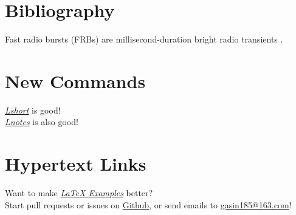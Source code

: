 \documentclass[a4paper,10pt]{article}
\begin{document}
    \section{Bibliography}
    Fast radio bursts (FRBs) are millisecond-duration bright radio transients
    \cite{Li2018,Lin2020}.
    
    
    \section{New Commands}
    \def\lshortURL{https://www.ctan.org/pkg/lshort}
    \def\lnotesURL{https://github.com/huangxg/lnotes}
    \newcommand{\isgood}[3][good]{\href{#3}{\emph{#2}} is #1!}
    \isgood{Lshort}{\lshortURL}\\
    \isgood[also good]{Lnotes}{\lnotesURL}
    \section{Hypertext Links}
    Want to make \href{lexample.pdf}{\emph{\LaTeX{} Examples}} better?\\
    Start pull requests or issues on
    \href{https://github.com/GasinAn/lexamples}{Github}, or send emails to
    \href{mailto:gasin185@163.com}{gasin185@163.com}!
\end{document}
